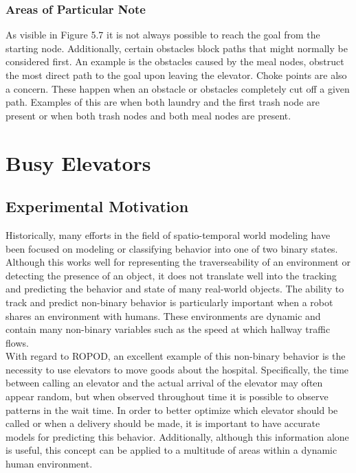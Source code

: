   \subsubsection{ Areas of Particular Note }

  As visible in Figure 5.7 it is not always possible to reach the goal from the
  starting node. Additionally, certain obstacles block paths that might
  normally be considered first. An example is the obstacles caused by
  the meal nodes, obstruct the most direct path to the goal upon leaving
  the elevator. Choke points are also a concern. These happen when an obstacle
  or obstacles completely cut off a given path. Examples of this are when both
  laundry and the first trash node are present or when both trash nodes and both
  meal nodes are present.
  \clearpage





  \section{ Busy Elevators }

  \subsection{ Experimental Motivation }

  Historically, many efforts in the field of spatio-temporal world modeling
  have been focused on modeling or classifying behavior into one of two binary
  states. Although this works well for
  representing the traverseability of an environment or detecting the presence of an object,
  it does not translate well into the tracking and predicting the behavior and
  state of many real-world objects. The ability to track and predict
  non-binary behavior is particularly important when a robot shares an
  environment with humans. These environments are dynamic and contain many
  non-binary variables such as the speed at which hallway traffic flows. \\

  With regard to ROPOD, an excellent example of this non-binary
  behavior is the necessity to use elevators to move goods about the hospital.
  Specifically, the time between calling an elevator and the actual arrival of
  the elevator may often appear random, but when observed throughout time
  it is possible to observe patterns in the wait time. In order to better
  optimize which elevator should be called or when a delivery should be made, it
  is important to have accurate models for predicting this behavior.
  Additionally, although this information alone is useful, this concept can
  be applied to a multitude of areas within a dynamic human environment. \\

